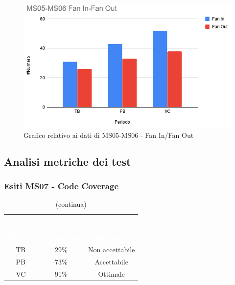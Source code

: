 \begin{figure}[H]
\centering
\includegraphics[scale=0.7]{./img/MS05-MS06.png}
\caption{Grafico relativo ai dati di MS05-MS06 - Fan In/Fan Out}
\end{figure}

\pagebreak
\subsection{Analisi metriche dei test}
\subsubsection{Esiti MS07 - Code Coverage}
\begin{longtable}{c c c}
\rowcolor{white}\caption{Esiti MS07 - Code Coverage} \\
	\rowcolor{redafk}
\textcolor{white}{\textbf{Periodo}} & 
\textcolor{white}{\textbf{Percentuale}} & 
\textcolor{white}{\textbf{Riscontro}} \\
	\endfirsthead
		\rowcolor{white}\caption[]{(continua)} \\
		\rowcolor{redafk}
\textcolor{white}{\textbf{Periodo}} & 
\textcolor{white}{\textbf{Percentuale}} & 
\textcolor{white}{\textbf{Riscontro}} \\
	\endhead
	TB & 29\% & Non accettabile\\
	PB & 73\% & Accettabile\\
	VC & 91\% & Ottimale\\
\end{longtable}

